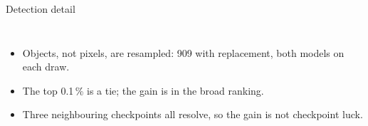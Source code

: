 \documentclass[aspectratio=169,10pt]{beamer}
\begin{document}
\begin{frame}{Detection detail}
\begin{columns}[T,onlytextwidth]
\par\vspace{0.3mm}
\par
\vspace{2mm}
\begin{itemize}\setlength{\itemsep}{0.4mm}\scriptsize
\item Objects, not pixels, are resampled: 909 with replacement, both models on each draw.
\item The top 0.1\,\% is a tie; the gain is in the broad ranking.
\item Three neighbouring checkpoints all resolve, so the gain is not checkpoint luck.
\end{itemize}
\end{columns}
\end{frame}
\end{document}
